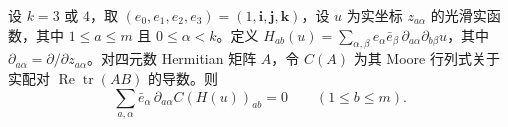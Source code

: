 设 $k=3$ 或 $4$，取 $(e_0,e_1,e_2,e_3)=(1,\mathbf i,\mathbf j,\mathbf k)$，设 $u$ 为实坐标 $z_{a\alpha}$ 的光滑实函数，其中 $1\le a\le m$ 且 $0\le\alpha<k$。定义 $H_{ab}(u)=\sum_{\alpha,\beta}e_\alpha\bar e_\beta\,\partial_{a\alpha}\partial_{b\beta}u$，其中 $\partial_{a\alpha}=\partial/\partial z_{a\alpha}$。对四元数 Hermitian 矩阵 $A$，令 $C(A)$ 为其 Moore 行列式关于实配对 $\operatorname{Re}\operatorname{tr}(AB)$ 的导数。则
\[
\sum_{a,\alpha}\bar e_\alpha\,\partial_{a\alpha} C(H(u))_{ab}=0
\qquad(1\le b\le m).
\]
